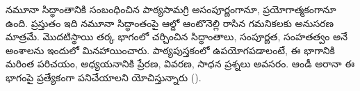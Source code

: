 \documentclass[../../include/open-logic-part]{subfiles}
\begin{document}

\begin{editorial}
  నమూనా సిద్ధాంతానికి సంబంధించిన పాఠ్యసామగ్రి అసంపూర్ణంగానూ,
  ప్రయోగాత్మకంగానూ ఉంది. ప్రస్తుతం ఇది నమూనా సిద్ధాంతంపై ఆల్డో ఆంటొనెల్లి రాసిన
  గమనికలకు అనుసరణ మాత్రమే. మొదటిస్థాయి తర్క భాగంలో
  చర్చించిన సిద్ధాంతాలు, సంపూర్ణత, సంహతత్వం అనే అంశాలను
  ఇందులో మినహాయించారు. పాఠ్యపుస్తకంలో ఉపయోగపడాలంటే, ఈ భాగానికి మరింత
  పరిచయం, అధ్యయనానికి ప్రేరణ, వివరణ, సాధన ప్రశ్నలు అవసరం. ఆండీ అరానా ఈ భాగంపై
  ప్రత్యేకంగా పనిచేయాలని యోచిస్తున్నారు ().
\end{editorial}





\OLEndPartHook
\end{document}

